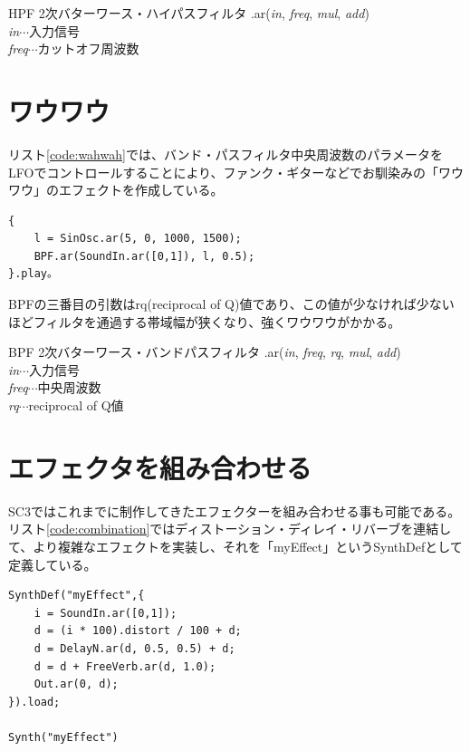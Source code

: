 \documentclass{jsarticle}
\begin{document}
\begin{itembox}[l]{HPF}
{\footnotesize 
2次バターワース・ハイパスフィルタ
.ar({\it in}, {\it freq}, {\it mul}, {\it add})\\

{\it in}$\cdots$入力信号\\
{\it freq}$\cdots$カットオフ周波数\\
}
\end{itembox}

\section{ワウワウ}
リスト\ref{code:wahwah}では、バンド・パスフィルタ中央周波数のパラメータをLFOでコントロールすることにより、ファンク・ギターなどでお馴染みの「ワウワウ」のエフェクトを作成している。
\begin{lstlisting}[caption=ワウワウ, label=code:wahwah]
{
	l = SinOsc.ar(5, 0, 1000, 1500);
	BPF.ar(SoundIn.ar([0,1]), l, 0.5);
}.play。
\end{lstlisting}

BPFの三番目の引数はrq(reciprocal of Q)値であり、この値が少なければ少ないほどフィルタを通過する帯域幅が狭くなり、強くワウワウがかかる。

\begin{itembox}[l]{BPF}
{\footnotesize 
2次バターワース・バンドパスフィルタ
.ar({\it in}, {\it freq}, {\it rq}, {\it mul}, {\it add})\\

{\it in}$\cdots$入力信号\\
{\it freq}$\cdots$中央周波数\\
{\it rq}$\cdots$reciprocal of Q値\\
}
\end{itembox}

\section{エフェクタを組み合わせる}
SC3ではこれまでに制作してきたエフェクターを組み合わせる事も可能である。リスト\ref{code:combination}ではディストーション・ディレイ・リバーブを連結して、より複雑なエフェクトを実装し、それを「myEffect」というSynthDefとして定義している。

\begin{lstlisting}[caption=エフェクトの組み合わせ, label=code:combination]
SynthDef("myEffect",{
	i = SoundIn.ar([0,1]);
	d = (i * 100).distort / 100 + d;
	d = DelayN.ar(d, 0.5, 0.5) + d;
	d = d + FreeVerb.ar(d, 1.0);
	Out.ar(0, d);
}).load;

Synth("myEffect")
\end{lstlisting}
\end{document}
